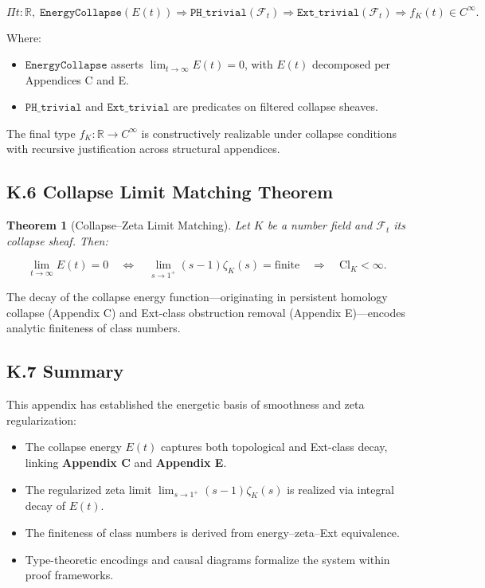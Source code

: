 \documentclass[11pt]{article}
\newtheorem{theorem}{Theorem}[section]
\begin{document}
\[
\Pi t : \mathbb{R},\;
\texttt{EnergyCollapse}(E(t)) \Rightarrow \texttt{PH\_trivial}(\mathcal{F}_t) \Rightarrow \texttt{Ext\_trivial}(\mathcal{F}_t) \Rightarrow f_K(t) \in C^\infty.
\]

\noindent
Where:
\begin{itemize}
  \item $\texttt{EnergyCollapse}$ asserts $\lim_{t \to \infty} E(t) = 0$, with $E(t)$ decomposed per Appendices C and E.
  \item $\texttt{PH\_trivial}$ and $\texttt{Ext\_trivial}$ are predicates on filtered collapse sheaves.
\end{itemize}

The final type $f_K : \mathbb{R} \to C^\infty$ is constructively realizable under collapse conditions with recursive justification across structural appendices.

\subsection*{K.6 Collapse Limit Matching Theorem}

\begin{theorem}[Collapse–Zeta Limit Matching]
Let $K$ be a number field and $\mathcal{F}_t$ its collapse sheaf. Then:

\[
\lim_{t \to \infty} E(t) = 0
\quad \Leftrightarrow \quad
\lim_{s \to 1^+} (s-1)\zeta_K(s) = \text{finite}
\quad \Rightarrow \quad
\mathrm{Cl}_K < \infty.
\]
\end{theorem}

The decay of the collapse energy function—originating in persistent homology collapse (Appendix C) and Ext-class obstruction removal (Appendix E)—encodes analytic finiteness of class numbers.

\subsection*{K.7 Summary}

This appendix has established the energetic basis of smoothness and zeta regularization:
\begin{itemize}
  \item The collapse energy $E(t)$ captures both topological and Ext-class decay, linking \textbf{Appendix C} and \textbf{Appendix E}.
  \item The regularized zeta limit $\lim_{s \to 1^+} (s - 1)\zeta_K(s)$ is realized via integral decay of $E(t)$.
  \item The finiteness of class numbers is derived from energy–zeta–Ext equivalence.
  \item Type-theoretic encodings and causal diagrams formalize the system within proof frameworks.
\end{itemize}
\end{document}
